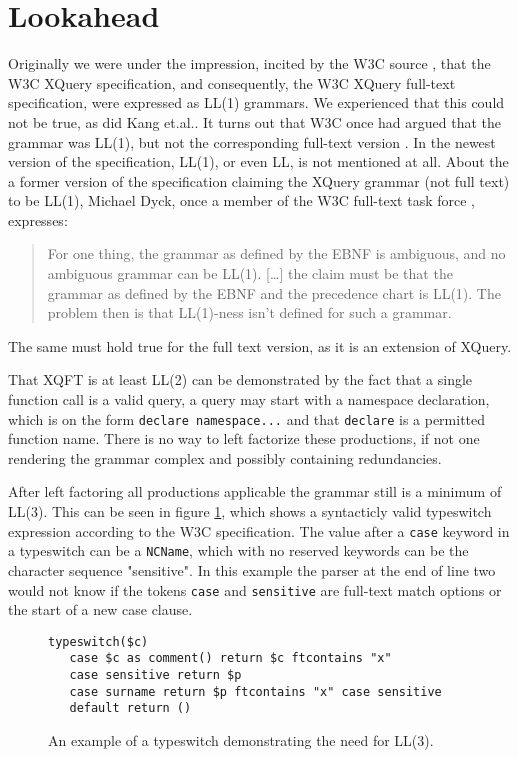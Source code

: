\section{Lookahead}
\label{sect:discussion:lookahead}
Originally we were under the impression, incited by the W3C source \cite{createTokenizer}, that the W3C XQuery specification, and consequently, the W3C XQuery full-text specification, were expressed as LL(1) grammars. We experienced that this could not be true, as did Kang et.al.\cite{kang_xquery_diglib}. It turns out that W3C once had argued that the grammar was LL(1), but not the corresponding full-text version \cite{grammarIsLL1}. In the newest version of the specification, LL(1), or even LL, is not mentioned at all. About the a former version of the specification claiming the XQuery grammar (not full text) to be LL(1), Michael Dyck, once a member of the W3C full-text task force \cite{dyckIsTaskForce}, expresses\cite{dyckOnList}:
\begin{quote}
For one thing, the grammar as defined by the EBNF is ambiguous, and no ambiguous grammar can be LL(1). [\ldots] the claim must be that the grammar as defined by the EBNF and the precedence chart is LL(1). The problem then is that LL(1)-ness isn't defined for such a grammar.
\end{quote}
The same must hold true for the full text version, as it is an extension of XQuery.

That XQFT is at least LL(2) can be demonstrated by the fact that a single function call is a valid query, a query may start with a namespace declaration, which is on the form \verb!declare namespace...! and that \verb!declare! is a permitted function name. There is no way to left factorize these productions, if not one rendering the grammar complex and possibly containing redundancies.

After left factoring all productions applicable the grammar still is a minimum of LL(3). This can be seen in figure \ref{fig:notLL2}, which shows a syntacticly valid typeswitch expression according to the W3C specification. The value after a \verb!case! keyword in a typeswitch can be a \verb!NCName!, which with no reserved keywords can be the character sequence "sensitive". In this example the parser at the end of line two would not know if the tokens \verb!case! and \verb!sensitive! are full-text match options or the start of a new case clause.

\begin{figure}[h!]
\begin{Verbatim}
typeswitch($c) 
   case $c as comment() return $c ftcontains "x"
   case sensitive return $p
   case surname return $p ftcontains "x" case sensitive
   default return ()
\end{Verbatim}
\label{fig:notLL2}
\caption[A typeswitch shows the need for LL(3)]{An example of a typeswitch demonstrating the need for LL(3).}
\end{figure}

